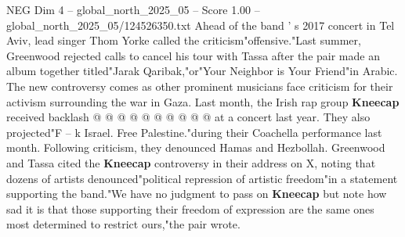 \begin{textsample}{NEG Dim 4 – global\_north\_2025\_05 – Score 1.00 – global\_north\_2025\_05/124526350.txt}
Ahead of the band ' s 2017 concert in Tel Aviv, lead singer Thom Yorke called the criticism"offensive."Last summer, Greenwood rejected calls to cancel his tour with Tassa after the pair made an album together titled"Jarak Qaribak,"or"Your Neighbor is Your Friend"in Arabic.
The new controversy comes as other prominent musicians face criticism for their activism surrounding the war in Gaza.
Last month, the Irish rap group \textbf{Kneecap} received backlash @ @ @ @ @ @ @ @ @ @ at a concert last year.
They also projected"F -- k Israel.
Free Palestine."during their Coachella performance last month.
Following criticism, they denounced Hamas and Hezbollah.
Greenwood and Tassa cited the \textbf{Kneecap} controversy in their address on X, noting that dozens of artists denounced"political repression of artistic freedom"in a statement supporting the band."We have no judgment to pass on \textbf{Kneecap} but note how sad it is that those supporting their freedom of expression are the same ones most determined to restrict ours,"the pair wrote.

\end{textsample}

